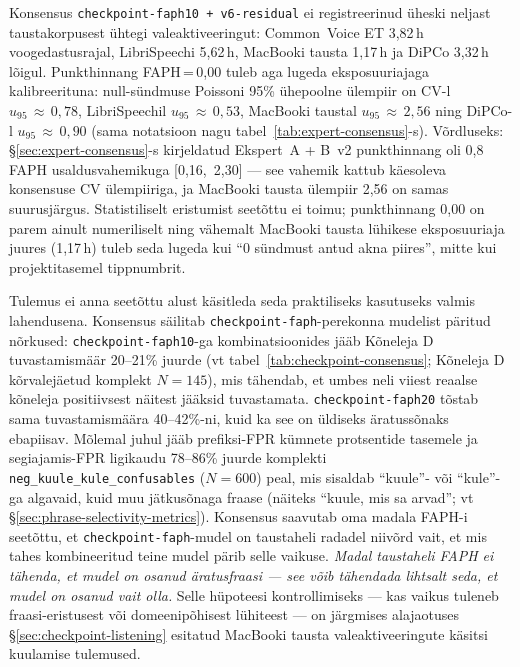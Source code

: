 Konsensus \texttt{checkpoint-faph10 + v6-residual} ei registreerinud üheski neljast taustakorpusest ühtegi valeaktiveeringut: Common~Voice ET 3,82\,h voogedastusrajal, LibriSpeechi 5,62\,h, MacBooki tausta 1,17\,h ja DiPCo 3,32\,h lõigul. Punkthinnang FAPH\,=\,0,00 tuleb aga lugeda eksposuuriajaga kalibreerituna: null-sündmuse Poissoni 95\% ühepoolne ülempiir on CV-l $u_{95}\,\approx\,0{,}78$, LibriSpeechil $u_{95}\,\approx\,0{,}53$, MacBooki taustal $u_{95}\,\approx\,2{,}56$ ning DiPCo-l $u_{95}\,\approx\,0{,}90$ (sama notatsioon nagu tabel~\ref{tab:expert-consensus}-s). Võrdluseks: §\ref{sec:expert-consensus}-s kirjeldatud Ekspert~A + B~v2 punkthinnang oli 0,8\,FAPH usaldusvahemikuga [0,16,~2,30] --- see vahemik kattub käesoleva konsensuse CV ülempiiriga, ja MacBooki tausta ülempiir 2,56 on samas suurusjärgus. Statistiliselt eristumist seetõttu ei toimu; punkthinnang 0,00 on parem ainult numeriliselt ning vähemalt MacBooki tausta lühikese eksposuuriaja juures (1,17\,h) tuleb seda lugeda kui \enquote{0 sündmust antud akna piires}, mitte kui projektitasemel tippnumbrit.

Tulemus ei anna seetõttu alust käsitleda seda praktiliseks kasutuseks valmis lahendusena. Konsensus säilitab \texttt{checkpoint-faph}-perekonna mudelist päritud nõrkused: \texttt{checkpoint-faph10}-ga kombinatsioonides jääb Kõneleja D tuvastamismäär 20--21\% juurde (vt tabel~\ref{tab:checkpoint-consensus}; Kõneleja D kõrvalejäetud komplekt $N=145$), mis tähendab, et umbes neli viiest reaalse kõneleja positiivsest näitest jääksid tuvastamata. \texttt{checkpoint-faph20} tõstab sama tuvastamismäära 40--42\%-ni, kuid ka see on üldiseks äratussõnaks ebapiisav. Mõlemal juhul jääb prefiksi-FPR kümnete protsentide tasemele ja segiajamis-FPR ligikaudu 78--86\% juurde komplekti \texttt{neg\_kuule\_kule\_confusables} ($N=600$) peal, mis sisaldab \enquote{kuule}- või \enquote{kule}-ga algavaid, kuid muu jätkusõnaga fraase (näiteks \enquote{kuule, mis sa arvad}; vt §\ref{sec:phrase-selectivity-metrics}). Konsensus saavutab oma madala FAPH-i seetõttu, et \texttt{checkpoint-faph}-mudel on taustaheli radadel niivõrd vait, et mis tahes kombineeritud teine mudel pärib selle vaikuse. \emph{Madal taustaheli FAPH ei tähenda, et mudel on osanud äratusfraasi --- see võib tähendada lihtsalt seda, et mudel on osanud vait olla.} Selle hüpoteesi kontrollimiseks --- kas vaikus tuleneb fraasi-eristusest või domeenipõhisest lühiteest --- on järgmises alajaotuses §\ref{sec:checkpoint-listening} esitatud MacBooki tausta valeaktiveeringute käsitsi kuulamise tulemused.

